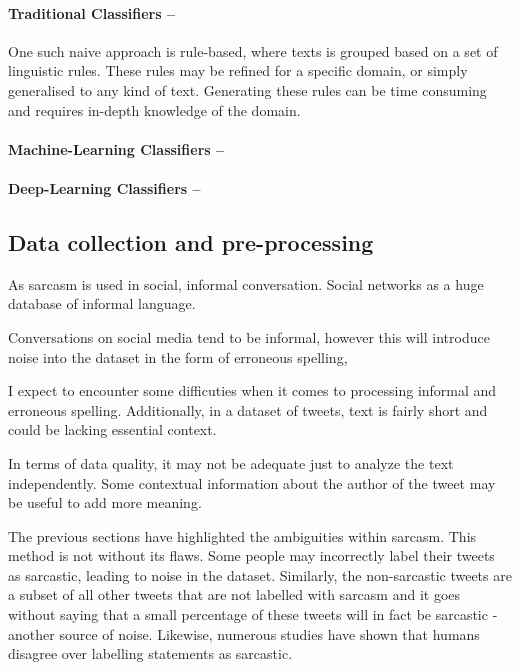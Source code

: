 \documentclass[12pt,a4paper]{article}
\begin{document}
\paragraph{Traditional Classifiers --}
One such naive approach is rule-based, where texts is grouped based on a set of linguistic rules. These rules may be refined for a specific domain, or simply generalised to any kind of text. Generating these rules can be time consuming and requires in-depth knowledge of the domain. 

\paragraph{Machine-Learning Classifiers --}


\paragraph{Deep-Learning Classifiers --}


\newpage
\subsection{Data collection and pre-processing}
As sarcasm is used in social, informal conversation. Social networks as a huge database of informal language. 

Conversations on social media tend to be informal, however this will introduce noise into the dataset in the form of erroneous spelling, 

I expect to encounter some difficuties when it comes to processing informal and erroneous spelling. Additionally, in a dataset of tweets, text is fairly short and could be lacking essential context.

In terms of data quality, it may not be adequate just to analyze the text independently. Some contextual information about the author of the tweet may be useful to add more meaning.

\noindent The previous sections have highlighted the ambiguities within sarcasm. 
This method is not without its flaws. Some people may incorrectly label their tweets as sarcastic, leading to noise in the dataset. Similarly, the non-sarcastic tweets are a subset of all other tweets that are not labelled with sarcasm and it goes without saying that a small percentage of these tweets will in fact be sarcastic - another source of noise.
Likewise, numerous studies have shown that humans disagree over labelling statements as sarcastic.
\end{document}

